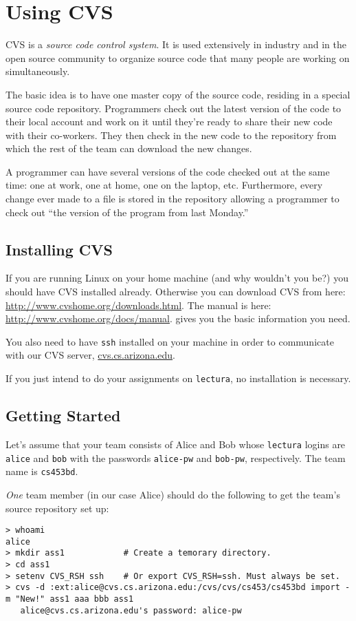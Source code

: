\section{Using CVS}
CVS is a {\em source code control system}. It is used extensively
in industry and in the open source community to organize source
code that many people are working on simultaneously. 

The basic idea is to have one master copy of the source code,
residing in a special source code repository.
Programmers check out the latest version of the code to
their local account and work on it until they're ready to
share their new code with their co-workers. They then
check in the new code to the repository from which the
rest of the team can download the new changes. 

A programmer can have several versions of the code checked 
out at the same time: one at work, one at home, one on the
laptop, etc. Furthermore, every change ever made to a file
is stored in the repository allowing a programmer to check
out ``the version of the program from last Monday.''


\subsection{Installing CVS}
If you are running Linux on your home machine (and why wouldn't
you be?) you should have CVS installed already. Otherwise you
can download CVS from here: \url{http://www.cvshome.org/downloads.html}.
The manual is here: \url{http://www.cvshome.org/docs/manual}. 
 gives you the basic information you need.

You also need to have {\tt ssh} installed on your machine
in order to communicate with our CVS server, 
\url{cvs.cs.arizona.edu}.

If you just intend to do your assignments on {\tt lectura},
no installation is necessary.

\subsection{Getting Started}
Let's assume that your team consists of Alice and Bob whose
{\tt lectura} logins are {\tt alice} and {\tt bob} with
the passwords {\tt alice-pw} and {\tt bob-pw}, respectively.
The team name is {\tt cs453bd}.

{\em One} team member (in our case Alice) should do the following 
to get the team's source repository set up:
\begin{verbatim}
> whoami
alice
> mkdir ass1            # Create a temorary directory.
> cd ass1
> setenv CVS_RSH ssh    # Or export CVS_RSH=ssh. Must always be set.
> cvs -d :ext:alice@cvs.cs.arizona.edu:/cvs/cvs/cs453/cs453bd import -m "New!" ass1 aaa bbb ass1
   alice@cvs.cs.arizona.edu's password: alice-pw
\end{verbatim}

